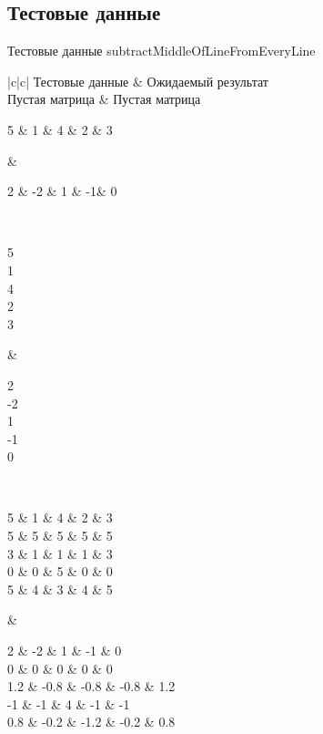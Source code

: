 \documentclass[a4paper, 12pt, oneside]{article}
\newcommand\labeltable[3] {
    \captionsetup{format=tablecaption}
    \begin{table}[H]
        \caption{#2}
        \begin{center}
            #1
        \end{center}
        \label{#3}
    \end{table}
}
\begin{document}
    \subsection{Тестовые данные}

    \labeltable{
        \begin{tabular}{|c|c|}
            \hline
            Тестовые данные & Ожидаемый результат \\
            \hline Пустая матрица
            & Пустая матрица \\
            \hline
            \begin{pmatrix}
                5 & 1 & 4 & 2 & 3
            \end{pmatrix} & \begin{pmatrix}
                                2 & -2 & 1 & -1& 0
            \end{pmatrix}
            \\
            \hline
            \begin{pmatrix}
                5 \\ 1 \\ 4 \\ 2 \\ 3
            \end{pmatrix} & \begin{pmatrix}
                                2 \\ -2 \\ 1 \\  -1\\ 0
            \end{pmatrix} \\
            \hline
            \begin{pmatrix}
                5 & 1 & 4 & 2 & 3 \\
                5 & 5 & 5 & 5 & 5 \\
                3 & 1 & 1 & 1 & 3 \\
                0 & 0 & 5 & 0 & 0 \\
                5 & 4 & 3 & 4 & 5 \\
            \end{pmatrix} & \begin{pmatrix}
                                2   & -2   & 1    & -1   & 0   \\
                                0   & 0    & 0    & 0    & 0   \\
                                1.2 & -0.8 & -0.8 & -0.8 & 1.2 \\
                                -1  & -1   & 4    & -1   & -1  \\
                                0.8 & -0.2 & -1.2 & -0.2 & 0.8 \\
            \end{pmatrix}
            \\
            \hline
        \end{tabular}
    }{Тестовые данные subtractMiddleOfLineFromEveryLine}{tab:task4-test-table}
\end{document}

